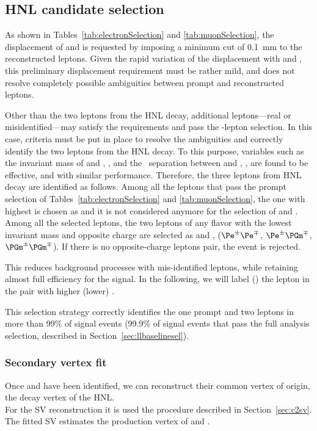 \subsection{HNL candidate selection}
As shown in Tables~\ref{tab:electronSelection} and
\ref{tab:muonSelection},
the displacement of \ltwo and \lthree is requested by imposing a
minimum \absdxy cut of 0.1~mm to the reconstructed leptons.
Given the rapid variation of the \hnl displacement with \mhnl and
\mixpar, this preliminary displacement requirement must be rather
mild, and does not resolve completely possible ambiguities between
prompt and \displ reconstructed leptons.

Other than the two leptons from the HNL decay, additional
leptons---real or misidentified---may satisfy the \absdxy requirements
and pass the \displ-lepton selection. In this case, criteria must
be put in place to resolve the ambiguities and correctly identify the
two leptons from the HNL decay.
To this purpose, variables such as the invariant mass of \ltwo and
\lthree, \mtwol, and the \DR\ separation between \ltwo and \lthree, \DRtwol, are found to be
effective, and with similar performance.
Therefore, the three leptons from HNL decay are identified as follows.
Among all the leptons that pass the prompt selection of
Tables~\ref{tab:electronSelection} and \ref{tab:muonSelection}, the one
with highest \pt is chosen as \lone and it is not considered anymore for the selection of \ltwo and \lthree.
Among all the selected \displ leptons, the two leptons of any
flavor with the lowest invariant mass and opposite charge are selected
as \ltwo and \lthree,
($\Pe^\pm\Pe^\mp$, $\Pe^\pm\PGm^\mp$, $\PGm^\pm\PGm^\mp$).
If there is no opposite-charge \displ leptons pair, the
event is rejected. 

This reduces background processes with
mis-identified leptons, while retaining almost full efficiency for the
signal. In the following, we will label \ltwo (\lthree) the lepton in
the pair with higher (lower) \pt.

This selection strategy correctly identifies the one prompt and two
\displ leptons in more than 99\% of signal events (99.9\% of
signal events that pass the full analysis selection, described in
Section~\ref{sec:llbaselinesel}).

\subsubsection{Secondary vertex fit}

Once \ltwo and \lthree have been identified, we can reconstruct their
common vertex of origin, \ie the decay vertex of the HNL. \\
For the SV reconstruction it is used the procedure described in Section~\ref{sec:c2sv}.
The fitted SV estimates the production vertex of \ltwo and \lthree.

